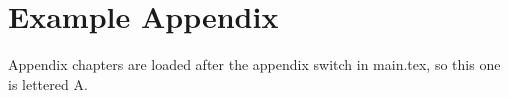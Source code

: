 \chapter{Example Appendix}
\label{app:example}

Appendix chapters are loaded after the appendix switch in main.tex, so this
one is lettered A.
